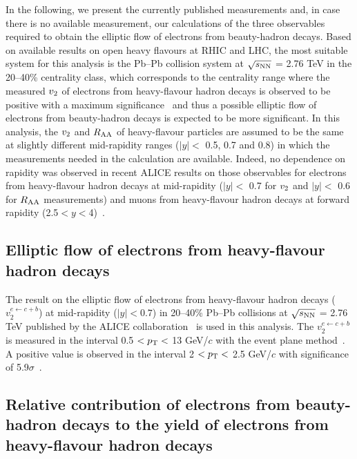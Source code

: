 \documentclass[11pt,a4paper]{article}
\providecommand{\raa}{$R_{\rm{\rm AA}}$ }
\providecommand{\vtwo}{$v_{\rm 2}$ }
\providecommand{\snn}{$\sqrt{s_{\rm NN}}$ }
\begin{document}
In the following, we present the currently published measurements and, in case there is no available measurement, our calculations  of the three observables required to obtain the elliptic flow of electrons from beauty-hadron decays. 
Based on   available results on open heavy flavours  at RHIC and LHC, the most suitable system for this analysis is  the Pb--Pb collision system at \snn = 2.76 TeV in the 20--40\% centrality class, which corresponds to the centrality range where the measured \vtwo of electrons from heavy-flavour hadron decays is observed to be positive with a maximum significance~\cite{Adam:2016ssk} and thus a possible elliptic flow of electrons from beauty-hadron decays is expected to be more significant.
In this analysis, the \vtwo and \raa of heavy-flavour particles are assumed to be the same at slightly different mid-rapidity ranges ($|y| <$ 0.5, 0.7 and 0.8)  in which the measurements needed in the calculation are available. Indeed, no dependence on rapidity was observed in recent ALICE results on those observables for electrons from heavy-flavour hadron decays at mid-rapidity ($|y| <$ 0.7 for \vtwo and $|y| <$ 0.6 for \raa measurements) and muons from heavy-flavour hadron decays at forward   rapidity (2.5$ < y < $4)~\cite{Adam:2016ssk,HFERAA}.


\subsection{Elliptic flow of electrons from heavy-flavour hadron decays}
\label{Sec:ElectronFromHFV2}


The result on the elliptic flow of electrons from heavy-flavour hadron decays ($v_{2}^{e \leftarrow c+b}$) at  mid-rapidity  ($|y| < 0.7$) in 20--40\% Pb--Pb collisions at \snn = 2.76 TeV published by the ALICE collaboration~\cite{Adam:2016ssk}  is used in this analysis. The $v_{2}^{e \leftarrow c+b}$ is measured in the interval 0.5 $< p_{\rm T} <$ 13 GeV/$c$ with the event plane method~\cite{PhysRevC.58.1671}. A positive value is observed in the interval  2 $< p_{\rm T} <$ 2.5 GeV/$c$ with significance of 5.9$\sigma$~\cite{Adam:2016ssk}.

\subsection{Relative contribution of electrons from beauty-hadron decays to the yield of electrons from heavy-flavour hadron decays}
\label{Sec:R}
\end{document}
